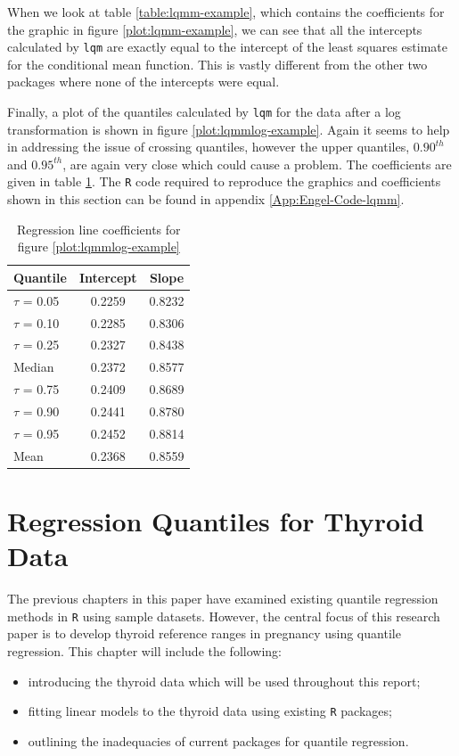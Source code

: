 \documentclass[12pt,a4paper]{report}
\begin{document}
When we look at table \ref{table:lqmm-example}, which contains the coefficients for the graphic in figure \ref{plot:lqmm-example}, we can see that all the intercepts calculated by {\small\verb"lqm"} are exactly equal to the intercept of the least squares estimate for the conditional mean function. This is vastly different from the other two packages where none of the intercepts were equal.
\vspace{2mm}

Finally, a plot of the quantiles calculated by {\small\verb"lqm"} for the data after a log transformation is shown in figure \ref{plot:lqmmlog-example}. Again it seems to help in addressing the issue of crossing quantiles, however the upper quantiles, $0.90^{th}$ and $0.95^{th}$, are again very close which could cause a problem. The coefficients are given in table \ref{table:lqmmlog-example}. The {\small\verb"R"} code required to reproduce the graphics and coefficients shown in this section can be found in appendix \ref{App:Engel-Code-lqmm}.

\begin{table}[ht]
\begin{center}
\begin{tabular}{|l||c|c|} \hline
\multicolumn{1}{|l||}{Quantile}&\multicolumn{1}{c|}{Intercept}&\multicolumn{1}{c|}{Slope}\tabularnewline
\hline
$\tau$ = 0.05&0.2259&0.8232\tabularnewline
$\tau$ = 0.10&0.2285&0.8306\tabularnewline
$\tau$ = 0.25&0.2327&0.8438\tabularnewline
Median&0.2372&0.8577\tabularnewline
$\tau$ = 0.75&0.2409&0.8689\tabularnewline
$\tau$ = 0.90&0.2441&0.8780\tabularnewline
$\tau$ = 0.95&0.2452&0.8814\tabularnewline
Mean&0.2368&0.8559\tabularnewline
\hline
\end{tabular}
\end{center}
\caption{Regression line coefficients for figure \ref{plot:lqmmlog-example}}
\label{table:lqmmlog-example}
\end{table}



\chapter{Regression Quantiles for Thyroid Data}\label{ThyroidReg}
The previous chapters in this paper have examined existing quantile regression methods in {\small\verb"R"} using sample datasets. However, the central focus of this research paper is to develop thyroid reference ranges in pregnancy using quantile regression. This chapter will include the following:
\begin{itemize}
    \item introducing the thyroid data which will be used throughout this report;
    \item fitting linear models to the thyroid data using existing {\small\verb"R"} packages;
    \item outlining the inadequacies of current packages for quantile regression.
\end{itemize}
\end{document}
